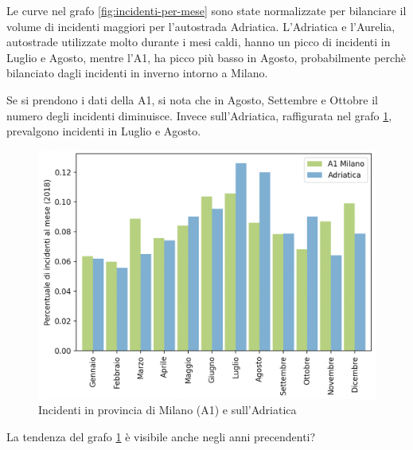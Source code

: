 \documentclass[a4paper]{report}
\begin{document}
Le curve nel grafo \ref{fig:incidenti-per-mese} sono state normalizzate per bilanciare il volume di incidenti maggiori per 
l'autostrada Adriatica.
L'Adriatica e l'Aurelia, autostrade utilizzate molto durante i mesi caldi, hanno un picco di 
incidenti in Luglio e Agosto, mentre l'A1, ha picco più basso in Agosto, probabilmente 
perchè bilanciato dagli incidenti in inverno intorno a Milano.

Se si prendono i dati della A1, si nota che in Agosto, Settembre e Ottobre il numero degli 
incidenti diminuisce.
Invece sull'Adriatica, raffigurata nel grafo \ref{fig:milano-adriatica}, 
prevalgono incidenti in Luglio e Agosto.

\begin{figure}
    \includegraphics[width=\linewidth]{../src/incidenti/incidenti_aci/autostrade/milano_adriatica_2018.png}
    \caption{Incidenti in provincia di Milano (A1) e sull'Adriatica}
    \label{fig:milano-adriatica}
\end{figure}

La tendenza del grafo \ref{fig:milano-adriatica} è visibile anche negli anni precendenti?
\end{document}

